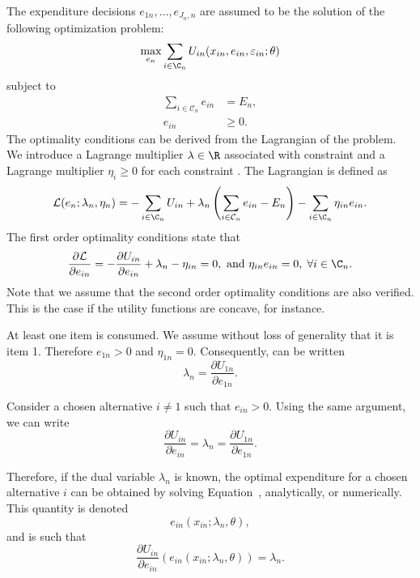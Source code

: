 \documentclass[12pt,a4paper]{article}
\renewcommand{\L}{\mathcal{L}}
\begin{document}
The expenditure decisions $e_{1n}, \ldots, e_{J_n, n}$ are assumed to be the solution of the following optimization problem:
\begin{equation}
\label{eq:obj}
\max_{e_n} \sum_{i \in \C_n} U_{in}(x_{in}, e_{in}, \varepsilon_{in}; \theta)
\end{equation}
subject to
\begin{align}
  \sum_{i \in \mathcal{C}_n} e_{in} & = E_n,\label{eq:budget_constraint}\\
 e_{in} &\geq 0. \label{eq:non_negativity}
\end{align}
The optimality conditions can be derived from the Lagrangian of the problem. We introduce a Lagrange multiplier $\lambda \in \R$
associated with constraint  and a Lagrange multiplier $\eta_i \geq 0$ for each constraint . The Lagrangian is defined as
\begin{equation}
  \L(e_n;\lambda_n, \eta_n) = -\sum_{i \in \C_n} U_{in} + \lambda_n\left(\sum_{i \in \mathcal{C}_n} e_{in}-E_n\right) - \sum_{i \in \C_n} \eta_{in} e_{in}.
\end{equation}
The first order optimality conditions state that
\begin{equation}
  \label{eq:optimality}
\frac{\partial \L}{\partial e_{in}} = - \frac{\partial U_{in}}{\partial e_{in}} + \lambda_n - \eta_{in}  = 0, \text{ and } \eta_{in} e_{in} = 0, \; \forall i \in \C_n.
\end{equation}
Note that we assume that the second order optimality conditions are also verified. This is the case if the utility functions are concave, for instance.

At least one item is consumed. We assume without loss of generality that it is item 1. Therefore $e_{1n} > 0$ and $\eta_{1n}=0$. Consequently,  can be written
\begin{equation}
    \label{eq:optimality_one}
\lambda_n = \frac{\partial U_{1n}}{\partial e_{1n}}.
\end{equation}

Consider a chosen alternative $i\neq 1$ such that $e_{in} > 0$. Using the same argument, we can write
\begin{equation}
    \label{eq:optimality_i}
\frac{\partial U_{in}}{\partial e_{in}} = \lambda_n= \frac{\partial U_{1n}}{\partial e_{1n}}.
\end{equation}

Therefore, if the dual variable $\lambda_n$ is known, the optimal expenditure for a chosen alternative $i$ can be obtained by solving
Equation~, analytically, or numerically. This quantity is denoted
\begin{equation}
    \label{eq:optimal_consumption}
    e_{in}(x_{in}; \lambda_n, \theta),
\end{equation}
and is such that
\[
   \frac{\partial U_{in}}{\partial e_{in}}\left(e_{in}(x_{in}; \lambda_n, \theta)\right) = \lambda_n.
\]
\end{document}
